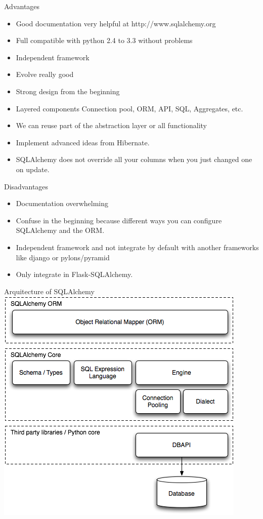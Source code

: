 \documentclass[seagull]{beamer}
\begin{document}
\begin{frame}{Advantages}
\begin{itemize}
	\item Good documentation very helpful at http://www.sqlalchemy.org
	\item Full compatible with python 2.4 to 3.3 without problems
	\item Independent framework
	\item Evolve really good
	\item Strong design from the beginning
	\item Layered components Connection pool, ORM, API, SQL, Aggregates, etc.
	\item We can reuse part of the abstraction layer or all functionality
	\item Implement advanced ideas from Hibernate.
	\item SQLAlchemy does not override all your columns when you just changed one on update.
\end{itemize}
\end{frame}

\begin{frame}{Disadvantages}
\begin{itemize}
	\item Documentation overwhelming
	\item Confuse in the beginning because different ways you can configure SQLAlchemy and the ORM.
	\item Independent framework and not integrate by default with another frameworks like django or pylons/pyramid
	\item Only integrate in Flask-SQLAlchemy.
\end{itemize}
\end{frame}

\begin{frame}{Arquitecture of SQLAlchemy}
	\centering\includegraphics[scale=0.5]{sqla-arch.png}
\end{frame}
\end{document}
